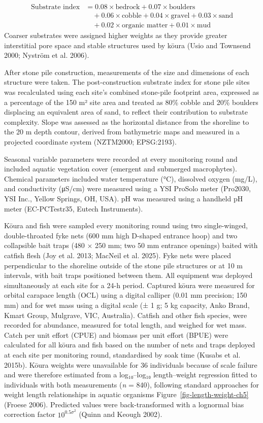 \documentclass[
  12pt,
  a4paper,
  oneside]{scrbook}
\begin{document}
\[
\begin{aligned}
\text{Substrate index} &= 0.08 \times \text{bedrock} + 0.07 \times \text{boulders} \\
&\quad + 0.06 \times \text{cobble} + 0.04 \times \text{gravel} + 0.03 \times \text{sand} \\
&\quad + 0.02 \times \text{organic matter} + 0.01 \times \text{mud}
\end{aligned}
\] Coarser substrates were assigned higher weights as they provide
greater interstitial pore space and stable structures used by kōura
(Usio and Townsend 2000; Nyström et al. 2006).

After stone pile construction, measurements of the size and dimensions
of each structure were taken. The post-construction substrate index for
stone pile sites was recalculated using each site's combined stone-pile
footprint area, expressed as a percentage of the 150 m² site area and
treated as 80\% cobble and 20\% boulders displacing an equivalent area
of sand, to reflect their contribution to substrate complexity. Slope
was assessed as the horizontal distance from the shoreline to the 20 m
depth contour, derived from bathymetric maps and measured in a projected
coordinate system (NZTM2000; EPSG:2193).

Seasonal variable parameters were recorded at every monitoring round and
included aquatic vegetation cover (emergent and submerged macrophytes).
Chemical parameters included water temperature (°C), dissolved oxygen
(mg/L), and conductivity (μS/cm) were measured using a YSI ProSolo meter
(Pro2030, YSI Inc., Yellow Springs, OH, USA). pH was measured using a
handheld pH meter (EC-PCTestr35, Eutech Instruments).

Kōura and fish were sampled every monitoring round using two
single-winged, double-throated fyke nets (600 mm high D-shaped entrance
hoop) and two collapsible bait traps (480 × 250 mm; two 50 mm entrance
openings) baited with catfish flesh (Joy et al. 2013; MacNeil et al.
2025). Fyke nets were placed perpendicular to the shoreline outside of
the stone pile structures or at 10 m intervals, with bait traps
positioned between them. All equipment was deployed simultaneously at
each site for a 24-h period. Captured kōura were measured for orbital
carapace length (OCL) using a digital calliper (0.01 mm precision; 150
mm) and for wet mass using a digital scale (± 1 g; 5 kg capacity, Anko
Brand, Kmart Group, Mulgrave, VIC, Australia). Catfish and other fish
species, were recorded for abundance, measured for total length, and
weighed for wet mass. Catch per unit effort (CPUE) and biomass per unit
effort (BPUE) were calculated for all kōura and fish based on the number
of nets and traps deployed at each site per monitoring round,
standardised by soak time (Kusabs et al. 2015b). Kōura weights were
unavailable for 36 individuals because of scale failure and were
therefore estimated from a log₁₀--log₁₀ length--weight regression fitted
to individuals with both measurements (\emph{n} = 840), following
standard approaches for weight length relationships in aquatic organisms
{Figure~\ref{fig-length-weight-ch5}} (Froese 2006). Predicted values
were back-transformed with a lognormal bias correction factor
\(10^{0.5 \sigma^2}\) (Quinn and Keough 2002).
\end{document}
